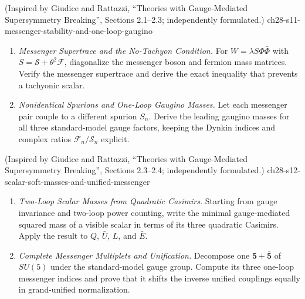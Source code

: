\begin{enumerate}
    {(Inspired by Giudice and Rattazzi, ``Theories with Gauge-Mediated Supersymmetry Breaking'', Sections 2.1--2.3; independently formulated.)}
    {ch28-s11-messenger-stability-and-one-loop-gaugino}
  \begin{enumerate}
    \item \emph{Messenger Supertrace and the No-Tachyon Condition.}
    For \(W=\lambda S\Phi\bar\Phi\) with
      \(S=\mathcal S+\theta^2\mathcal F\), diagonalize the messenger boson and
      fermion mass matrices.  Verify the messenger supertrace and derive the
      exact inequality that prevents a tachyonic scalar.
    \item \emph{Nonidentical Spurions and One-Loop Gaugino Masses.}
    Let each messenger pair couple to a different spurion \(S_n\).  Derive
      the leading gaugino masses for all three standard-model gauge factors,
      keeping the Dynkin indices and complex ratios
      \(\mathcal F_n/\mathcal S_n\) explicit.
  \end{enumerate}

    {(Inspired by Giudice and Rattazzi, ``Theories with Gauge-Mediated Supersymmetry Breaking'', Sections 2.3--2.4; independently formulated.)}
    {ch28-s12-scalar-soft-masses-and-unified-messenger}
  \begin{enumerate}
    \item \emph{Two-Loop Scalar Masses from Quadratic Casimirs.}
    Starting from gauge invariance and two-loop power counting, write the
      minimal gauge-mediated squared mass of a visible scalar in terms of its
      three quadratic Casimirs.  Apply the result to \(Q\), \(\bar U\),
      \(L\), and \(\bar E\).
    \item \emph{Complete Messenger Multiplets and Unification.}
    Decompose one \(\boldsymbol5+\bar{\boldsymbol5}\) of \(SU(5)\) under the
      standard-model gauge group.  Compute its three one-loop messenger
      indices and prove that it shifts the inverse unified couplings equally
      in grand-unified normalization.
  \end{enumerate}


\end{enumerate}
